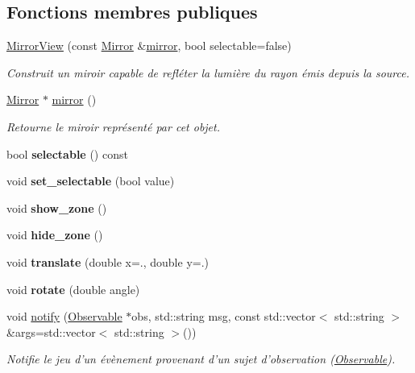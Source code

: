 \subsection*{Fonctions membres publiques}
\begin{DoxyCompactItemize}
\item 
\hyperlink{classMirrorView_a04dab41c29196186c918e60a1b2487b2}{Mirror\+View} (const \hyperlink{classMirror}{Mirror} \&\hyperlink{classMirrorView_a61c25961d7e140d5a8ff38aeb5ce8da2}{mirror}, bool selectable=false)
\begin{DoxyCompactList}\small\item\em Construit un miroir capable de refléter la lumière du rayon émis depuis la source. \end{DoxyCompactList}\item 
\hyperlink{classMirror}{Mirror} $\ast$ \hyperlink{classMirrorView_a61c25961d7e140d5a8ff38aeb5ce8da2}{mirror} ()
\begin{DoxyCompactList}\small\item\em Retourne le miroir représenté par cet objet. \end{DoxyCompactList}\item 
\hypertarget{classMirrorView_ad52e5d438a1b61b135c2ca56cadcd090}{bool {\bfseries selectable} () const }\label{classMirrorView_ad52e5d438a1b61b135c2ca56cadcd090}

\item 
\hypertarget{classMirrorView_a67fc521e337191818dba7c1abfbb6e84}{void {\bfseries set\+\_\+selectable} (bool value)}\label{classMirrorView_a67fc521e337191818dba7c1abfbb6e84}

\item 
\hypertarget{classMirrorView_ac9a758db6d2c5c99e1f5923a6248d296}{void {\bfseries show\+\_\+zone} ()}\label{classMirrorView_ac9a758db6d2c5c99e1f5923a6248d296}

\item 
\hypertarget{classMirrorView_a64fbd2447cb892fd6ffebf14a525c806}{void {\bfseries hide\+\_\+zone} ()}\label{classMirrorView_a64fbd2447cb892fd6ffebf14a525c806}

\item 
\hypertarget{classMirrorView_aaff1fd052baf4a65b6c99e75889f3705}{void {\bfseries translate} (double x=., double y=.)}\label{classMirrorView_aaff1fd052baf4a65b6c99e75889f3705}

\item 
\hypertarget{classMirrorView_aaf32c32a640e6a13e92efe3f91292ad6}{void {\bfseries rotate} (double angle)}\label{classMirrorView_aaf32c32a640e6a13e92efe3f91292ad6}

\item 
void \hyperlink{classMirrorView_a5a44e12f257cb45a9f1fcc2104c08499}{notify} (\hyperlink{classObservable}{Observable} $\ast$obs, std\+::string msg, const std\+::vector$<$ std\+::string $>$ \&args=std\+::vector$<$ std\+::string $>$())
\begin{DoxyCompactList}\small\item\em Notifie le jeu d'un évènement provenant d'un sujet d'observation (\hyperlink{classObservable}{Observable}). \end{DoxyCompactList}\end{DoxyCompactItemize}
